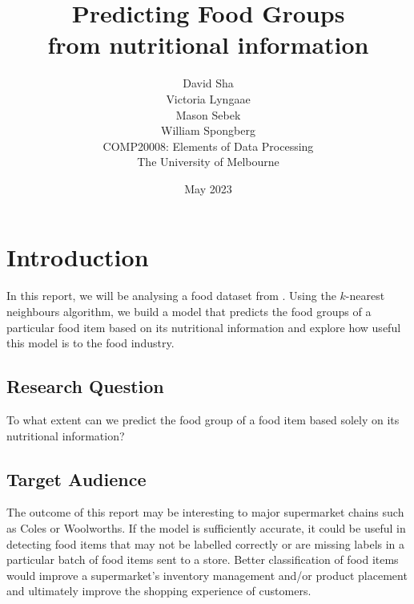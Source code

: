 \documentclass[11pt]{article}
\title{Predicting Food Groups \\ \vspace{0.5em} \large from nutritional information}
\author{
    David Sha\\
\AND
    Victoria Lyngaae\\
\AND
    Mason Sebek\\
\AND
    William Spongberg\\
\AND
\AND
	COMP20008: Elements of Data Processing\\
\AND
	The University of Melbourne\\
}
\date{May 2023}
\begin{document}
\maketitle

\newpage
\tableofcontents
\thispagestyle{empty}

\newpage
\setcounter{page}{1}
\section{Introduction}

In this report, we will be analysing a food dataset from \cite{FoodStandardsAustraliaNewZealand}. Using the $k$-nearest neighbours algorithm, we build a model that predicts the food groups of a particular food item based on its nutritional information and explore how useful this model is to the food industry.


\subsection{Research Question}
To what extent can we predict the food group of a food item based solely on its nutritional information?

\subsection{Target Audience}
The outcome of this report may be interesting to major supermarket chains such as Coles or Woolworths. If the model is sufficiently accurate, it could be useful in detecting food items that may not be labelled correctly or are missing labels in a particular batch of food items sent to a store. Better classification of food items would improve a supermarket's inventory management and/or product placement and ultimately improve the shopping experience of customers.
\end{document}

